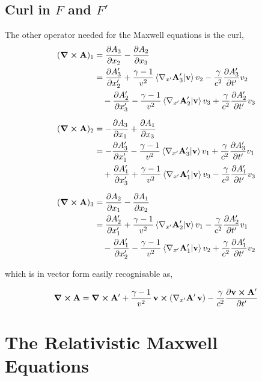 \documentclass[12pt]{article}
\begin{document}
\subsection{Curl in $F$ and $F'$}

The other operator needed for the Maxwell equations is the curl,
\[
  \begin{aligned}
    (\curl \vb{A})_1 &= \pdv{A_3}{x_2} - \pdv{A_2}{x_3} \\
      &= \pdv{A'_3}{x'_2}
        + \frac{\gamma-1}{v^2}\ip{\nabla_{x'}\vb{A}'_3}{\vb{v}}v_2
        - \frac{\gamma}{c^2}\pdv{A'_3}{t'}v_2 \\
      &\quad - \pdv{A'_2}{x'_3}
        - \frac{\gamma-1}{v^2}\ip{\nabla_{x'}\vb{A}'_2}{\vb{v}}v_3
        + \frac{\gamma}{c^2}\pdv{A'_2}{t'}v_3 \\[6pt]
   (\curl \vb{A})_2 &= -\pdv{A_3}{x_1} + \pdv{A_1}{x_3} \\
  &= -\pdv{A'_3}{x'_1}
    - \frac{\gamma-1}{v^2}
      \ip{\nabla_{x'}\vb{A}'_3}{\vb{v}}v_1
    + \frac{\gamma}{c^2}\pdv{A'_3}{t'}v_1 \\
  &\quad + \pdv{A'_1}{x'_3}
    + \frac{\gamma-1}{v^2}
      \ip{\nabla_{x'}\vb{A}'_1}{\vb{v}}v_3
    - \frac{\gamma}{c^2}\pdv{A'_1}{t'}v_3 \\[6pt]
    (\curl \vb{A})_3 &= \pdv{A_2}{x_1} - \pdv{A_1}{x_2} \\
      &= \pdv{A'_2}{x'_1}
        + \frac{\gamma-1}{v^2}\ip{\nabla_{x'}\vb{A}'_2}{\vb{v}}v_1
        - \frac{\gamma}{c^2}\pdv{A'_2}{t'}v_1 \\
      &\quad - \pdv{A'_1}{x'_2}
        - \frac{\gamma-1}{v^2}\ip{\nabla_{x'}\vb{A}'_1}{\vb{v}}v_2
        + \frac{\gamma}{c^2}\pdv{A'_1}{t'}v_2
  \end{aligned}
\]

which is in vector form easily recognisable as,

\begin{equation}
  \curl \vb{A}
  =
  \curl \vb{A}'
  + \frac{\gamma-1}{v^2}\,
    \vb v \cross
    \left(
      \nabla_{x'}\vb A'\,\vb v
    \right)
  - \frac{\gamma}{c^2}
    \pdv{\vb v\cross\vb A'}{t'}
  \label{eq:curl_in_F}
\end{equation}

\section{The Relativistic Maxwell Equations}
\end{document}
